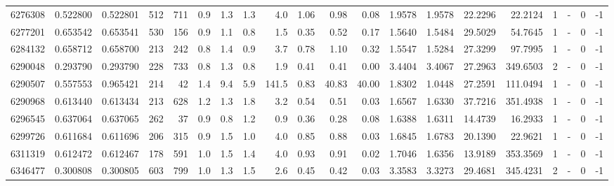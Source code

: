 \begin{tabular}{rrrrrrrrrrrrrrrrrlrl}
   6276308 & 0.522800 &   0.522801 &  512 &  711 &      0.9 &      1.3 &     1.3 &      4.0 &       1.06 &        0.98 &        0.08 &  1.9578 &  1.9578 &   22.2296 &   22.2124 &       1 &             - &        0 &        -1 \\
   6277201 & 0.653542 &   0.653541 &  530 &  156 &      0.9 &      1.1 &     0.8 &      1.5 &       0.35 &        0.52 &        0.17 &  1.5640 &  1.5484 &   29.5029 &   54.7645 &       1 &             - &        0 &        -1 \\
   6284132 & 0.658712 &   0.658700 &  213 &  242 &      0.8 &      1.4 &     0.9 &      3.7 &       0.78 &        1.10 &        0.32 &  1.5547 &  1.5284 &   27.3299 &   97.7995 &       1 &             - &        0 &        -1 \\
   6290048 & 0.293790 &   0.293790 &  228 &  733 &      0.8 &      1.3 &     0.8 &      1.9 &       0.41 &        0.41 &        0.00 &  3.4404 &  3.4067 &   27.2963 &  349.6503 &       2 &             - &        0 &        -1 \\
   6290507 & 0.557553 &   0.965421 &  214 &   42 &      1.4 &      9.4 &     5.9 &    141.5 &       0.83 &       40.83 &       40.00 &  1.8302 &  1.0448 &   27.2591 &  111.0494 &       1 &             - &        0 &        -1 \\
   6290968 & 0.613440 &   0.613434 &  213 &  628 &      1.2 &      1.3 &     1.8 &      3.2 &       0.54 &        0.51 &        0.03 &  1.6567 &  1.6330 &   37.7216 &  351.4938 &       1 &             - &        0 &        -1 \\
   6296545 & 0.637064 &   0.637065 &  262 &   37 &      0.9 &      0.8 &     1.2 &      0.9 &       0.36 &        0.28 &        0.08 &  1.6388 &  1.6311 &   14.4739 &   16.2933 &       1 &             - &        0 &        -1 \\
   6299726 & 0.611684 &   0.611696 &  206 &  315 &      0.9 &      1.5 &     1.0 &      4.0 &       0.85 &        0.88 &        0.03 &  1.6845 &  1.6783 &   20.1390 &   22.9621 &       1 &             - &        0 &        -1 \\
   6311319 & 0.612472 &   0.612467 &  178 &  591 &      1.0 &      1.5 &     1.4 &      4.0 &       0.93 &        0.91 &        0.02 &  1.7046 &  1.6356 &   13.9189 &  353.3569 &       1 &             - &        0 &        -1 \\
   6346477 & 0.300808 &   0.300805 &  603 &  799 &      1.0 &      1.3 &     1.5 &      2.6 &       0.45 &        0.42 &        0.03 &  3.3583 &  3.3273 &   29.4681 &  345.4231 &       2 &             - &        0 &        -1 \\

\end{tabular}
